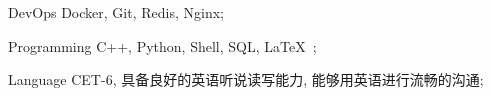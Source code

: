 

\begin{cvskills}

  \cvskill
    {DevOps} %
    {Docker, Git, Redis, Nginx;} %
    
  \cvskill
    {Programming} %
    {C++, Python, Shell, SQL, \LaTeX\ ;} %

  \cvskill
    {Language} %
    {CET-6, 具备良好的英语听说读写能力, 能够用英语进行流畅的沟通;} %

\end{cvskills}
